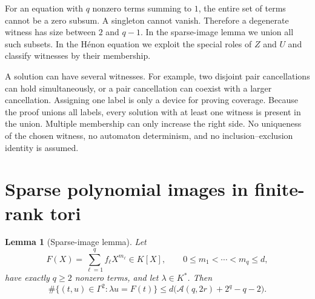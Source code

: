 \documentclass[11pt]{article}
\newtheorem{lemma}[theorem]{Lemma}
\theoremstyle{definition}
\newcommand{\Acal}{\mathcal A}
\newcommand{\card}{\#}
\begin{document}
For an equation with \(q\) nonzero terms summing to \(1\), the entire set of terms cannot be a zero subsum. A singleton cannot vanish. Therefore a degenerate witness has size between \(2\) and \(q-1\). In the sparse-image lemma we union all such subsets. In the Hénon equation we exploit the special roles of \(Z\) and \(U\) and classify witnesses by their membership.

A solution can have several witnesses. For example, two disjoint pair cancellations can hold simultaneously, or a pair cancellation can coexist with a larger cancellation. Assigning one label is only a device for proving coverage. Because the proof unions all labels, every solution with at least one witness is present in the union. Multiple membership can only increase the right side. No uniqueness of the chosen witness, no automaton determinism, and no inclusion--exclusion identity is assumed.

\section{Sparse polynomial images in finite-rank tori}
\label{sec:sparse}

\begin{lemma}[Sparse-image lemma]
\label{lem:sparse-image}
Let
\begin{equation}
 F(X)=\sum_{\ell=1}^{q} f_\ell X^{m_\ell}\in K[X],
 \qquad
 0\leq m_1<\cdots<m_q\leq d,
 \label{eq:sparse-F}
\end{equation}
have exactly \(q\geq2\) nonzero terms, and let \(\lambda\in K^*\). Then
\begin{equation}
 \card\{(t,u)\in\Gamma^2:\lambda u=F(t)\}
 \leq d\bigl(\Acal(q,2r)+2^q-q-2\bigr).
 \label{eq:sparse-bound}
\end{equation}
\end{lemma}
\end{document}
